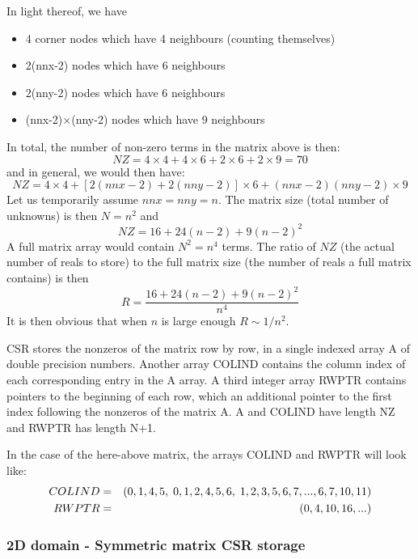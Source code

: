 In light thereof, we have
\begin{itemize}
\item 4 corner nodes which have 4 neighbours (counting themselves) 
\item 2(nnx-2) nodes which have 6 neighbours
\item 2(nny-2) nodes which have 6 neighbours
\item (nnx-2)$\times$(nny-2) nodes which have 9 neighbours
\end{itemize}
In total, the number of non-zero terms in the matrix above is then:
\[
NZ=4\times4+4\times6+2\times6+2\times9=70
\]
and in general, we would then have:
\[
NZ=4\times4+[2(nnx-2)+2(nny-2)]\times6 + (nnx-2)(nny-2)\times9
\]
Let us temporarily assume $nnx=nny=n$. The matrix size (total
number of unknowns) is then $N=n^2$ and  
\[
NZ=16+24(n-2)+9(n-2)^2
\]
A full matrix array would contain $N^2=n^4$ terms. 
The ratio of $NZ$ (the actual number of reals to store)
to the full matrix size (the number of reals a full matrix contains) is then 
\[
R = \frac{16+24(n-2)+9(n-2)^2}{n^4}
\]
It is then obvious that when $n$ is large enough $R \sim 1/n^2$.

CSR stores the nonzeros of the matrix row by row, in a
single indexed array A of double precision  numbers.
Another array COLIND contains the column index of each
corresponding entry in the A array. A third integer array RWPTR
contains pointers to the beginning of each row, which an additional pointer to
the first index following the nonzeros of the matrix A.
A and COLIND have length NZ and RWPTR has length N+1.

In the case of the here-above matrix, the arrays COLIND and RWPTR will look like:
\begin{eqnarray}
COLIND&=&(0,1,4,5, \; 0,1,2,4,5,6, \; 1,2,3,5,6,7, ..., 6,7,10,11) \nonumber\\
RWPTR &=&(0,4,10,16, ... )   \nonumber
\end{eqnarray}


\subsubsection{2D domain - Symmetric matrix CSR storage} \label{ss:symmcsrss}

